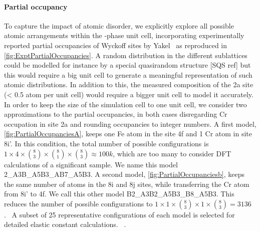 \documentclass[superscriptaddress, 12pt]{revtex4-2}%
\begin{document}
\paragraph{Partial occupancy} To capture the impact of atomic disorder, we explicitly explore all possible atomic arrangements within the \textsigma-phase unit cell, incorporating experimentally reported partial occupancies of Wyckoff sites by Yakel~\cite{yakel_atom_1983} as reproduced in \autoref{fig:ExptPartialOccupancies}.  
A random distribution in the different sublattices could be modelled for instance by a special quasirandom structure [SQS ref] but  this would require a big unit cell to generate a meaningful representation of such atomic distributions.  
In addition to this, the measured composition of the 2a site (< 0.5 atom per unit cell) would require a bigger unit cell to model it accurately.
In order to keep the size of the simulation cell to one unit cell, we consider two approximations to the partial occupancies, in both cases disregarding Cr occupation in site 2a and rounding occupancies to integer numbers.  
A first model, \autoref{fig:PartialOccupanciesA}, keeps one Fe atom in the site 4f and 1 Cr atom in site 8i'.  
In this condition, the total number of possible configurations is $ 1 \times 4 \times \binom{8}{3}\times \binom{8}{1} \times \binom {8}{3} \approx 100k $, which are too many to consider DFT calculations of a significant sample. 
We name this model 2\_A3B\_A5B3\_AB7\_A5B3.  
A second model, \autoref{fig:PartialOccupanciesb}, keeps the same number of atoms in the 8i and 8j sites, while transferring the Cr atom from 8i' to 4f.  
We call this other model B2\_A3B2\_A5B3\_B8\_A5B3. 
This reduces the number of possible configurations to $1 \times 1 \times \binom{8}{3}\times 1\times\binom {8}{3} = 3136$.~
A subset of 25 representative configurations of each model is selected for detailed elastic constant calculations. ~\cite{golesorkhtabar_elastic_2013}.
\end{document}
